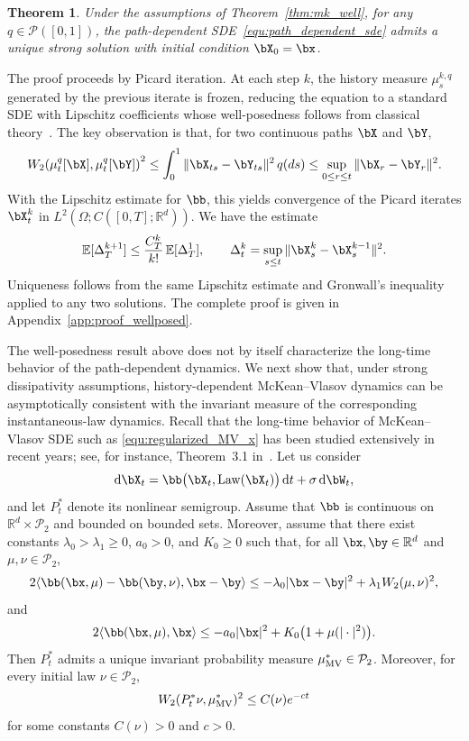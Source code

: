 \documentclass[a4paper,fleqn]{cas-sc}
\newtheorem{theorem}{Theorem}[section]
\theoremstyle{definition}
\begin{document}
\begin{theorem}\label{thm:path_wellposed}
Under the assumptions of Theorem~\ref{thm:mk_well}, for any 
\(q\in\mathcal P([0,1])\), the path-dependent SDE~\eqref{equ:path_dependent_sde}
admits a unique strong solution with initial condition \(\bX_0=\bx\).
\end{theorem}

The proof proceeds by Picard iteration. 
At each step \(k\), the history measure \(\mu_s^{k,q}\) generated by the previous iterate is frozen, reducing the equation to a standard SDE with Lipschitz coefficients whose well-posedness follows from classical theory~\cite{prevot2007concise}. 
The key observation is that, for two continuous paths \(\bX\) and \(\bY\),
\[
W_2\!\left(\mu_t^q[\bX],\mu_t^q[\bY]\right)^2
\le
\int_0^1 \|\bX_{ts}-\bY_{ts}\|^2\,q(ds)
\le
\sup_{0\le r\le t}\|\bX_r-\bY_r\|^2 .
\]
With the Lipschitz estimate for \(\bb\), this yields convergence of the Picard iterates \(\bX_t^k\) in 
\(L^2(\Omega;C([0,T];\mathbb R^d))\). 
We have the estimate
\[
\mathbb E[\Delta_T^{k+1}]
\le
\frac{C_T^k}{k!}\,\mathbb E[\Delta_T^1],
\qquad
\Delta_t^k
=
\sup_{s\le t}\|\bX_s^k-\bX_s^{k-1}\|^2 .
\]
Uniqueness follows from the same Lipschitz estimate and Gronwall's inequality applied to any two solutions. 
The complete proof is given in Appendix~\ref{app:proof_wellposed}.





The well-posedness result above does not by itself characterize the long-time behavior of the path-dependent dynamics. 
We next show that, under strong dissipativity assumptions, history-dependent McKean--Vlasov dynamics can be asymptotically consistent with the invariant measure of the corresponding instantaneous-law dynamics.
Recall that the long-time behavior of McKean--Vlasov SDE such as 
\eqref{equ:regularized_MV_x} has been studied extensively in recent years; see,
for instance, Theorem~3.1 in~\cite{wang2018distribution}. Let us consider 
\[
    {\rm d}\bX_t
    =
    \bb\bigl(\bX_t,{\rm Law}(\bX_t)\bigr)\,{\rm d}t
    +
    \sigma\,{\rm d}\bW_t ,
\]
and let $P_t^*$ denote its nonlinear semigroup. Assume that $\bb$ is continuous
on $\mathbb R^{d}\times\mathcal P_2$ and bounded on bounded sets. Moreover,
assume that there exist constants $\lambda_0>\lambda_1\ge 0$, $a_0>0$, and
$K_0\ge 0$ such that, for all
$\bx,\by\in\mathbb R^{d}$ and $\mu,\nu\in\mathcal P_2$,
\[
2\langle \bb(\bx,\mu)-\bb(\by,\nu),\bx-\by\rangle
\le
-\lambda_0|\bx-\by|^2
+
\lambda_1 W_2(\mu,\nu)^2,
\]
and
\[
2\langle \bb(\bx,\mu),\bx\rangle
\le
-a_0|\bx|^2
+
K_0\bigl(1+\mu(|\cdot|^2)\bigr).
\]
Then $P_t^*$ admits a unique invariant probability measure
$\mu_{\rm MV}^*\in\mathcal P_2$. Moreover, for every initial law
$\nu\in\mathcal P_2$,
\[
    W_2(P_t^*\nu,\mu_{\rm MV}^*)^2
    \le
    C(\nu)e^{-ct}
\]
for some constants $C(\nu)>0$ and $c>0$.
\end{document}
